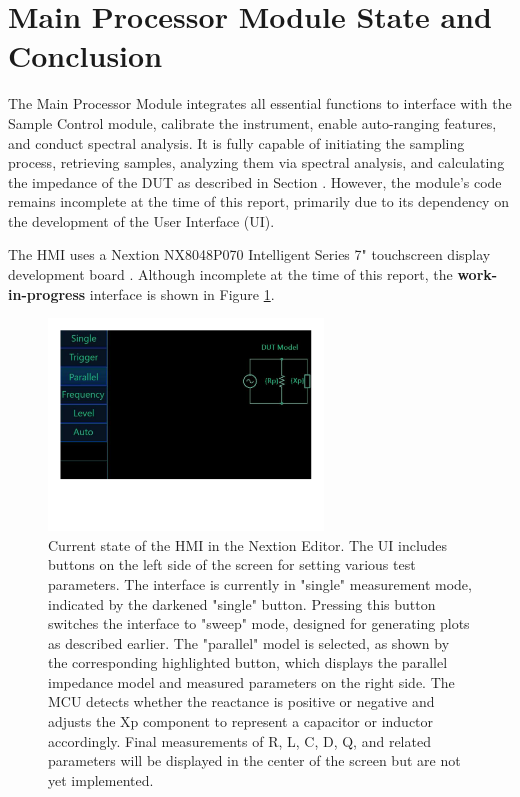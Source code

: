 \section{Main Processor Module State and Conclusion} \label{subsec:MCUConclusion}

The Main Processor Module integrates all essential functions to interface with the Sample Control module, calibrate the instrument, enable auto-ranging features, and conduct spectral analysis. It is fully capable of initiating the sampling process, retrieving samples, analyzing them via spectral analysis, and calculating the impedance of the DUT as described in Section . However, the module's code remains incomplete at the time of this report, primarily due to its dependency on the development of the User Interface (UI).

The HMI uses a Nextion NX8048P070 Intelligent Series 7" touchscreen display development board \cite{NextionDisplay}. Although incomplete at the time of this report, the \textbf{work-in-progress} interface is shown in Figure \ref{fig:7_3_3_NextionHMI}.

\begin{figure}[H] \centering \includegraphics[clip, trim=0 150 0 0, width=0.65\textwidth]{Sections/7_SystemDesign/Figures/7_3_3_UIStatus.pdf} \caption{Current state of the HMI in the Nextion Editor. The UI includes buttons on the left side of the screen for setting various test parameters. The interface is currently in "single" measurement mode, indicated by the darkened "single" button. Pressing this button switches the interface to "sweep" mode, designed for generating plots as described earlier. The "parallel" model is selected, as shown by the corresponding highlighted button, which displays the parallel impedance model and measured parameters on the right side. The MCU detects whether the reactance is positive or negative and adjusts the Xp component to represent a capacitor or inductor accordingly. Final measurements of R, L, C, D, Q, and related parameters will be displayed in the center of the screen but are not yet implemented.} \label{fig:7_3_3_NextionHMI} \end{figure}

